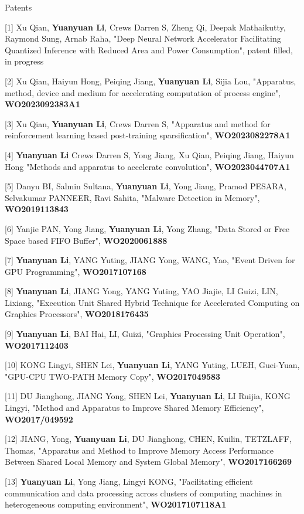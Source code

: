 \documentclass{resume} %
\begin{document}
\begin{rSection}{Patents}{}

[1] Xu Qian, \textbf{Yuanyuan Li}, Crews Darren S, Zheng Qi, Deepak Mathaikutty, Raymond Sung, Arnab Raha, "Deep Neural Network Accelerator Facilitating Quantized Inference with Reduced Area and Power Consumption", patent filled, in progress

[2] Xu Qian, Haiyun Hong, Peiqing Jiang, \textbf{Yuanyuan Li}, Sijia Lou, "Apparatus, method, device and medium for accelerating computation of process engine", \textbf{WO2023092383A1}

[3] Xu Qian, \textbf{Yuanyuan Li}, Crews Darren S, "Apparatus and method for reinforcement learning based post-training sparsification", \textbf{WO2023082278A1}

[4] \textbf{Yuanyuan Li} Crews Darren S, Yong Jiang, Xu Qian, Peiqing Jiang, Haiyun Hong "Methods and apparatus to accelerate convolution", \textbf{WO2023044707A1}

[5] Danyu BI, Salmin Sultana, \textbf{Yuanyuan Li}, Yong Jiang, Pramod PESARA, Selvakumar PANNEER, Ravi Sahita,  "Malware Detection in Memory", \textbf{WO2019113843}

[6] Yanjie PAN, Yong Jiang, \textbf{Yuanyuan Li}, Yong Zhang,  "Data Stored or Free Space based FIFO Buffer", \textbf{WO2020061888}

[7] \textbf{Yuanyuan Li}, YANG Yuting, JIANG Yong, WANG, Yao, "Event Driven for GPU Programming", \textbf{WO2017107168}

[8] \textbf{Yuanyuan Li}, JIANG Yong, YANG Yuting, YAO Jiajie, LI Guizi, LIN, Lixiang, "Execution Unit Shared Hybrid Technique for Accelerated Computing on Graphics Processors", \textbf{WO2018176435}

[9] \textbf{Yuanyuan Li}, BAI Hai, LI, Guizi, "Graphics Processing Unit Operation", \textbf{WO2017112403}

[10] KONG Lingyi, SHEN Lei, \textbf{Yuanyuan Li}, YANG Yuting, LUEH, Guei-Yuan, "GPU-CPU TWO-PATH Memory Copy", \textbf{WO2017049583}

[11] DU Jianghong, JIANG Yong, SHEN Lei, \textbf{Yuanyuan Li}, LI Ruijia, KONG Lingyi, "Method and Apparatus to Improve Shared Memory Efficiency", \textbf{WO2017/049592}

[12] JIANG, Yong, \textbf{Yuanyuan Li}, DU Jianghong, CHEN, Kuilin, TETZLAFF, Thomas, "Apparatus and Method to Improve Memory Access Performance Between Shared Local Memory and System Global Memory", \textbf{WO2017166269}

[13] \textbf{Yuanyuan Li}, Yong Jiang, Lingyi KONG, "Facilitating efficient communication and data processing across clusters of computing machines in heterogeneous computing environment", \textbf{WO2017107118A1}


\end{rSection}
\end{document}

